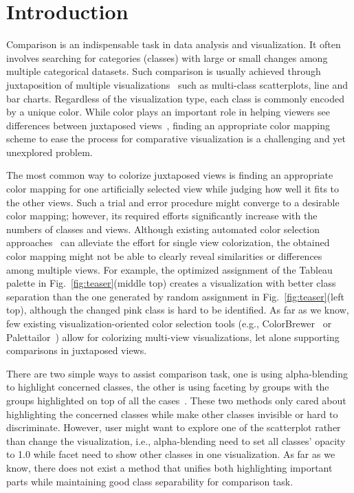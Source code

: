 \section{Introduction}
Comparison is an indispensable task in data analysis and visualization. It often involves searching for categories (classes) with large or small changes among multiple categorical datasets.
Such comparison is usually achieved through juxtaposition of multiple visualizations~\cite{Gleicher18,LYi21} such as multi-class scatterplots, line and bar charts.
Regardless of the visualization type, each class is commonly encoded by a unique color. While color plays an important role in helping viewers see differences between juxtaposed views~\cite{Tominski08,Albers11,Gleicher18}, finding an appropriate color mapping scheme to ease the process for comparative visualization is a challenging and yet unexplored problem.

The most common way to colorize juxtaposed views is finding an appropriate color mapping for one  artificially selected view while judging how well it fits to the other views. Such a trial and error procedure might converge to a desirable color mapping; however, its required efforts significantly increase with the numbers of classes and views. Although existing automated color selection approaches~\cite{Chen14,Wang2018,Lu21} can alleviate the effort for single view colorization, the obtained color mapping might not be able to clearly reveal similarities or differences among multiple views. For example, the optimized assignment\cite{Wang2018} of the Tableau palette in Fig.~\ref{fig:teaser}(middle top) creates a visualization with better class separation than the one generated by random assignment in Fig.~\ref{fig:teaser}(left top), although the changed pink class is hard to be identified.
As far as we know, few existing visualization-oriented color selection tools (e.g., ColorBrewer~\cite{harrower2003colorbrewer} or Palettailor~\cite{Lu21}) allow for colorizing multi-view visualizations, let alone supporting comparisons in juxtaposed views. %

There are two simple ways to assist comparison task, one is using alpha-blending to highlight concerned classes, the other is using faceting by groups with the groups highlighted on top of all the cases~\cite{}. These two methods only cared about highlighting the concerned classes while make other classes invisible or hard to discriminate. However, user might want to explore one of the scatterplot rather than change the visualization, i.e., alpha-blending need to set all classes' opacity to 1.0 while facet need to show other classes in one visualization. As far as we know, there does not exist a method that unifies both highlighting important parts while maintaining good class separability for comparison task.

